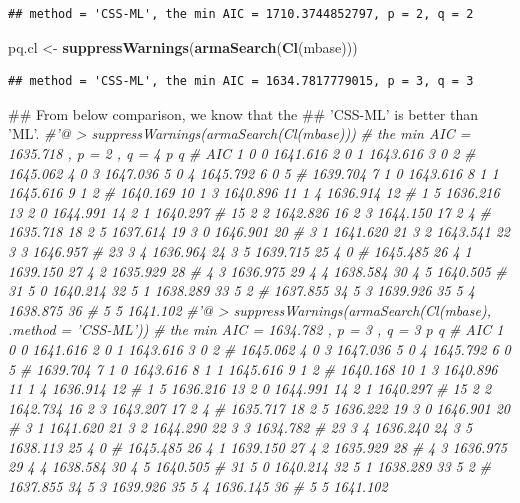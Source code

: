 \documentclass[]{tufte-book}
\newenvironment{Shaded}{}{}
\newcommand{\KeywordTok}[1]{\textcolor[rgb]{0.00,0.44,0.13}{\textbf{#1}}}
\newcommand{\StringTok}[1]{\textcolor[rgb]{0.25,0.44,0.63}{#1}}
\newcommand{\CommentTok}[1]{\textcolor[rgb]{0.38,0.63,0.69}{\textit{#1}}}
\newcommand{\NormalTok}[1]{#1}
\begin{document}
\begin{verbatim}
## method = 'CSS-ML', the min AIC = 1710.3744852797, p = 2, q = 2
\end{verbatim}

\begin{Shaded}
\begin{Highlighting}[]
\NormalTok{pq.cl <-}\StringTok{ }\KeywordTok{suppressWarnings}\NormalTok{(}\KeywordTok{armaSearch}\NormalTok{(}\KeywordTok{Cl}\NormalTok{(mbase)))}
\end{Highlighting}
\end{Shaded}

\begin{verbatim}
## method = 'CSS-ML', the min AIC = 1634.7817779015, p = 3, q = 3
\end{verbatim}

\begin{Shaded}
\begin{Highlighting}[]
\NormalTok{## From below comparison, we know that the}
\NormalTok{## 'CSS-ML' is better than 'ML'.}
\CommentTok{#'@ > suppressWarnings(armaSearch(Cl(mbase)))}
\CommentTok{# the min AIC = 1635.718 , p = 2 , q = 4 p q}
\CommentTok{# AIC 1 0 0 1641.616 2 0 1 1643.616 3 0 2}
\CommentTok{# 1645.062 4 0 3 1647.036 5 0 4 1645.792 6 0 5}
\CommentTok{# 1639.704 7 1 0 1643.616 8 1 1 1645.616 9 1 2}
\CommentTok{# 1640.169 10 1 3 1640.896 11 1 4 1636.914 12}
\CommentTok{# 1 5 1636.216 13 2 0 1644.991 14 2 1 1640.297}
\CommentTok{# 15 2 2 1642.826 16 2 3 1644.150 17 2 4}
\CommentTok{# 1635.718 18 2 5 1637.614 19 3 0 1646.901 20}
\CommentTok{# 3 1 1641.620 21 3 2 1643.541 22 3 3 1646.957}
\CommentTok{# 23 3 4 1636.964 24 3 5 1639.715 25 4 0}
\CommentTok{# 1645.485 26 4 1 1639.150 27 4 2 1635.929 28}
\CommentTok{# 4 3 1636.975 29 4 4 1638.584 30 4 5 1640.505}
\CommentTok{# 31 5 0 1640.214 32 5 1 1638.289 33 5 2}
\CommentTok{# 1637.855 34 5 3 1639.926 35 5 4 1638.875 36}
\CommentTok{# 5 5 1641.102}
\CommentTok{#'@ > suppressWarnings(armaSearch(Cl(mbase), .method = 'CSS-ML'))}
\CommentTok{# the min AIC = 1634.782 , p = 3 , q = 3 p q}
\CommentTok{# AIC 1 0 0 1641.616 2 0 1 1643.616 3 0 2}
\CommentTok{# 1645.062 4 0 3 1647.036 5 0 4 1645.792 6 0 5}
\CommentTok{# 1639.704 7 1 0 1643.616 8 1 1 1645.616 9 1 2}
\CommentTok{# 1640.168 10 1 3 1640.896 11 1 4 1636.914 12}
\CommentTok{# 1 5 1636.216 13 2 0 1644.991 14 2 1 1640.297}
\CommentTok{# 15 2 2 1642.734 16 2 3 1643.207 17 2 4}
\CommentTok{# 1635.717 18 2 5 1636.222 19 3 0 1646.901 20}
\CommentTok{# 3 1 1641.620 21 3 2 1644.290 22 3 3 1634.782}
\CommentTok{# 23 3 4 1636.240 24 3 5 1638.113 25 4 0}
\CommentTok{# 1645.485 26 4 1 1639.150 27 4 2 1635.929 28}
\CommentTok{# 4 3 1636.975 29 4 4 1638.584 30 4 5 1640.505}
\CommentTok{# 31 5 0 1640.214 32 5 1 1638.289 33 5 2}
\CommentTok{# 1637.855 34 5 3 1639.926 35 5 4 1636.145 36}
\CommentTok{# 5 5 1641.102}


\end{Highlighting}
\end{Shaded}
\end{document}
